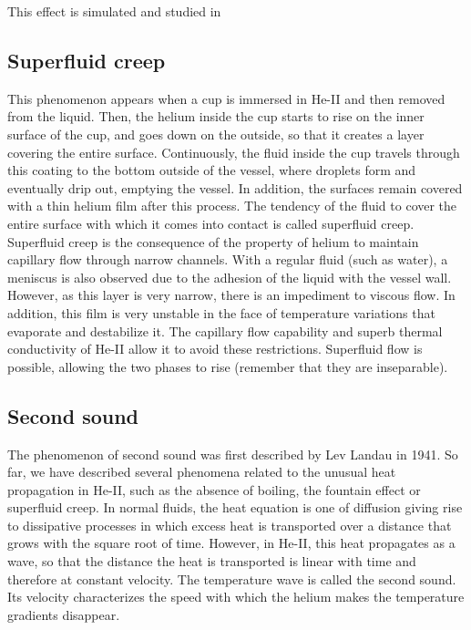 \documentclass{article}
\begin{document}
This effect is simulated and studied in \cite{Kincl}

\subsection{Superfluid creep}

This phenomenon appears when a cup is immersed in He-II and then removed from the liquid. Then, the helium inside the cup starts to rise on the inner surface of the cup, and goes down on the outside, so that it creates a layer covering the entire surface. Continuously, the fluid inside the cup travels through this coating to the bottom outside of the vessel, where droplets form and eventually drip out, emptying the vessel. In addition, the surfaces remain covered with a thin helium film after this process. The tendency of the fluid to cover the entire surface with which it comes into contact is called superfluid creep.
\\

Superfluid creep is the consequence of the property of helium to maintain capillary flow through narrow channels. With a regular fluid (such as water), a meniscus is also observed due to the adhesion of the liquid with the vessel wall. However, as this layer is very narrow, there is an impediment to viscous flow. In addition, this film is very unstable in the face of temperature variations that evaporate and destabilize it. The capillary flow capability and superb thermal conductivity of He-II allow it to avoid these restrictions. Superfluid flow is possible, allowing the two phases to rise (remember that they are inseparable).
\\

\subsection{Second sound}

The phenomenon of second sound was first described by Lev Landau in 1941. \cite{LevLan}
So far, we have described several phenomena related to the unusual heat propagation in He-II, such as the absence of boiling, the fountain effect or superfluid creep. In normal fluids, the heat equation is one of diffusion giving rise to dissipative processes in which excess heat is transported over a distance that grows with the square root of time. However, in He-II, this heat propagates as a wave, so that the distance the heat is transported is linear with time and therefore at constant velocity. The temperature wave is called the second sound. Its velocity characterizes the speed with which the helium makes the temperature gradients disappear.\\
\end{document}
